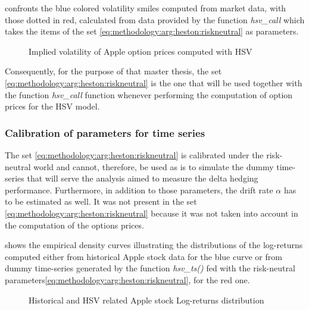 \documentclass[a4paper, 12pt]{report}
\begin{document}
 confronts the blue colored volatility smiles computed from market data, with those dotted in red, calculated from data provided by the function \textit{hsv\_call} which takes the items of the set \ref{eq:methodology:arg:heston:riskneutral} as parameters.

\begin{figure}[h]
  \centering
  
  \caption{Implied volatility of Apple option prices computed with HSV}
  \label{p:methodology:impliedvol:aapl:heston}
\end{figure}


Consequently, for the purpose of that master thesis, the set \ref{eq:methodology:arg:heston:riskneutral} is the one that will be used together with the function \textit{hsv\_call} function whenever performing the computation of option prices for the HSV model.

\subsubsection*{Calibration of parameters for time series}

The set \ref{eq:methodology:arg:heston:riskneutral} is calibrated under the risk-neutral world and cannot, therefore, be used as is to simulate the dummy time-series that will serve the analysis aimed to measure the delta hedging performance.
Furthermore, in addition to those parameters, the drift rate $\alpha$ has to be estimated as well. It was not present in the set  \ref{eq:methodology:arg:heston:riskneutral} because it was not taken into account in the computation of the options prices.

 shows the empirical density curves illustrating the distributions of the log-returns computed either from historical Apple stock data for the blue curve or from dummy time-series generated by the function \textit{hsv\_ts()} fed with the risk-neutral parameters\ref{eq:methodology:arg:heston:riskneutral}, for the red one.


\begin{figure}[h]
  \centering
  
  \caption{Historical and HSV related Apple stock Log-returns distribution}
  \label{p:methodology:density:aapl:heston:riskneutral}
\end{figure}
\end{document}
